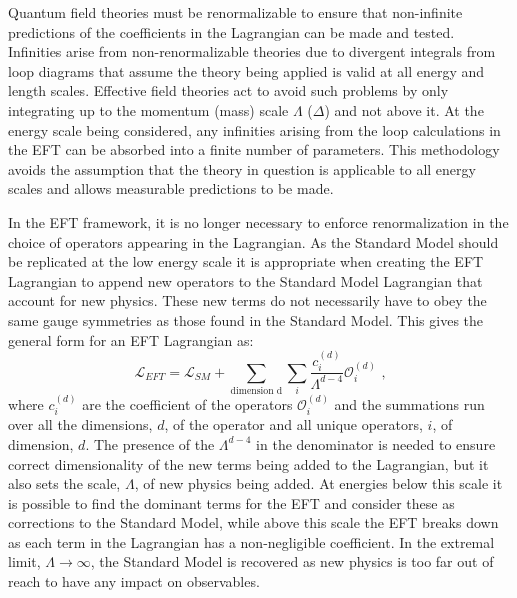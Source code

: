 Quantum field theories must be renormalizable to ensure that non-infinite predictions of the coefficients in the Lagrangian can be made and tested.  Infinities arise from non-renormalizable theories due to divergent integrals from loop diagrams that assume the theory being applied is valid at all energy and length scales.  Effective field theories act to avoid such problems by only integrating up to the momentum (mass) scale $\Lambda$ ($\Delta$) and not above it.  At the energy scale being considered, any infinities arising from the loop calculations in the EFT can be absorbed into a finite number of parameters.  This methodology avoids the assumption that the theory in question is applicable to all energy scales and allows measurable predictions to be made.  

In the EFT framework, it is no longer necessary to enforce renormalization in the choice of operators appearing in the Lagrangian.  As the Standard Model should be replicated at the low energy scale it is appropriate when creating the EFT Lagrangian to append new operators to the Standard Model Lagrangian that account for new physics.  These new terms do not necessarily have to obey the same gauge symmetries as those found in the Standard Model.  This gives the general form for an EFT Lagrangian as:
%
\begin{equation}
\mathcal{L}_{EFT} = \mathcal{L}_{SM} + \sum_{\text{dimension d}} \sum_{i} \frac{c_{i}^{(d)}}{\Lambda^{d-4}} \mathcal{O}_{i}^{(d)} \text{ ,}
\end{equation}
%
\noindent where $c_{i}^{(d)}$ are the coefficient of the operators $\mathcal{O}_{i}^{(d)}$ and the summations run over all the dimensions, $d$, of the operator and all unique operators, $i$, of dimension, $d$.  The presence of the $\Lambda^{d-4}$ in the denominator is needed to ensure correct dimensionality of the new terms being added to the Lagrangian, but it also sets the scale, $\Lambda$, of new physics being added.  At energies below this scale it is possible to find the dominant terms for the EFT and consider these as corrections to the Standard Model, while above this scale the EFT breaks down as each term in the Lagrangian has a non-negligible coefficient.  In the extremal limit, $\Lambda \rightarrow \infty$, the Standard Model is recovered as new physics is too far out of reach to have any impact on observables.



